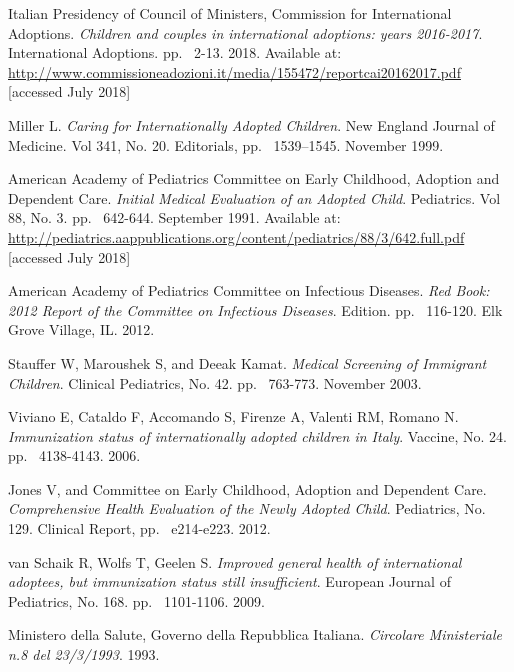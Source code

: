 \begin{thebibliography}{50}
  Italian Presidency of Council of Ministers, Commission for International Adoptions.
  \textit{Children and couples in international adoptions: years 2016-2017}.
  International Adoptions.
  pp. ~2-13.
  2018.
  Available at: \url{http://www.commissioneadozioni.it/media/155472/reportcai20162017.pdf} [accessed July 2018]  
  
  Miller L.
  \textit{Caring for Internationally Adopted Children}.
  New England Journal of Medicine. Vol 341, No. 20.
  Editorials,
  pp. ~1539–1545.
  November 1999.
  
  American Academy of Pediatrics Committee on Early Childhood, Adoption and Dependent Care.
  \textit{Initial Medical Evaluation of an Adopted Child}.
  Pediatrics. Vol 88, No. 3.
  pp. ~642-644.
  September 1991.
  Available at: \url{http://pediatrics.aappublications.org/content/pediatrics/88/3/642.full.pdf} [accessed July 2018]
  
  American Academy of Pediatrics Committee on Infectious Diseases.
  \textit{Red Book: 2012 Report of the Committee on Infectious Diseases}.
   Edition.
  pp. ~116-120.
  Elk Grove Village, IL.
  2012.

  Stauffer W, Maroushek S, and Deeak Kamat.
  \textit{Medical Screening of Immigrant Children}.
  Clinical Pediatrics, No. 42.
  pp. ~763-773.
  November 2003.
  
  Viviano E, Cataldo F, Accomando S, Firenze A, Valenti RM, Romano N.
  \textit{Immunization status of internationally adopted children in Italy}.
  Vaccine, No. 24.
  pp. ~4138-4143.
  2006.
  
  Jones V, and Committee on Early Childhood, Adoption and Dependent Care.
  \textit{Comprehensive Health Evaluation of the Newly Adopted Child}.
  Pediatrics, No. 129.
  Clinical Report,
  pp. ~e214-e223.
  2012.
  
  van Schaik R, Wolfs T, Geelen S.
  \textit{Improved general health of international adoptees, but immunization status still insufficient}.
  European Journal of Pediatrics, No. 168.
  pp. ~1101-1106.
  2009.
  
  Ministero della Salute, Governo della Repubblica Italiana.
  \textit{Circolare Ministeriale n.8 del 23/3/1993}.
  1993.


\end{thebibliography}
